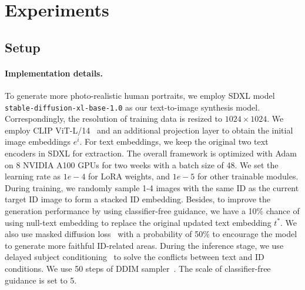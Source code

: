 \section{Experiments}

\subsection{Setup}

\paragraph{Implementation details.}
To generate more photo-realistic human portraits, we employ SDXL model~\cite{podell2023sdxl}  \texttt{stable-diffusion-xl-base-1.0} as our text-to-image synthesis model.
Correspondingly, the resolution of training data is resized to $1024 \times 1024$.
We employ CLIP ViT-L/14~\cite{radford2021learning} and an additional projection layer to obtain the initial image embeddings $e^{i}$.
For text embeddings, we keep the original two text encoders in SDXL for extraction.
The overall framework is optimized with Adam~\cite{kingma2014adam}  on 8 NVIDIA A100 GPUs for two weeks 
with a batch size of 48. 
We set the learning rate as $1e-4$ for LoRA weights, and $1e-5$ for other trainable modules.
During training, we randomly sample 1-4  images with the same ID as the current target ID image to form a stacked ID embedding.
Besides, to improve the generation performance by using classifier-free guidance, we have a 10\% chance of using null-text embedding to replace the original updated text embedding $t^{*}$.
We also use masked diffusion loss~\cite{avrahami2023break} with a probability of 50\% to encourage the model to generate more faithful ID-related areas.
During the inference stage, we use delayed subject conditioning~\cite{xiao2023fastcomposer} to solve the conflicts between text and ID conditions.
We use 50 steps of DDIM sampler~\cite{song2020denoising}.
The scale of classifier-free guidance is set to 5.


